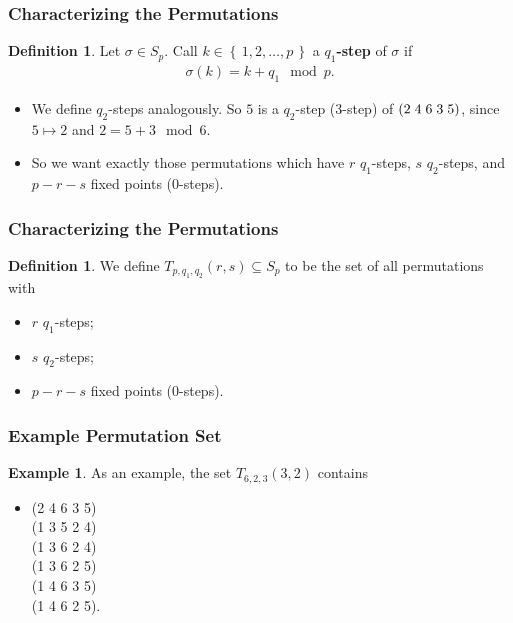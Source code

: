 \documentclass{beamer}
\theoremstyle{plain}
\theoremstyle{definition}
\newtheorem{Def}[theorem]{Definition}
\newtheorem{Ex}[theorem]{Example}
\theoremstyle{remark}
\newcommand{\sub}{\subseteq}			%
\newcommand{\bee}{\begin{equation}\begin{aligned}}
\newcommand{\eee}{\end{aligned}\end{equation}}
\renewcommand{\'}{\hspace{0.5mm}'}		%
\renewcommand{\Set}[1]{\left\{\,#1\,\right\}}	%
\begin{document}

\begin{frame}
\frametitle{Characterizing the Permutations}

\begin{Def}
	Let $\sigma \in S_p$. Call $k \in \Set{1,2,\hdots, p}$
	a $q_1$\textbf{-step} of $\sigma$ if 
	\bee
		\sigma(k) = k + q_1 \mod p. 
	\eee
\end{Def}
\begin{itemize}
	\item We define $q_2$-steps analogously. 
	So $5$ is a $q_2$-step ($3$-step) of 
	$(2\hspace{1mm}4\hspace{1mm}6\hspace{1mm}
	3\hspace{1mm}5)$, since $5 \mapsto 2$ and $2 = 5 + 3 \mod 6$. 
	\item So we want exactly those permutations which
	have $r$ $q_1$-steps, $s$ $q_2$-steps, and 
	$p - r - s$ fixed points ($0$-steps). 
\end{itemize}

\end{frame}


\begin{frame}
\frametitle{Characterizing the Permutations}

\begin{Def}
	We define $T_{p,q_1,q_2}(r,s) \sub S_p$ to be the 
	set of all permutations with 
	\begin{itemize}
		\item $r$ $q_1$-steps;
		\item $s$ $q_2$-steps;
		\item $p - r - s$ fixed points ($0$-steps).
	\end{itemize}
	
\end{Def}

\end{frame}


\begin{frame}
\frametitle{Example Permutation Set}

\begin{Ex}
	As an example, the set $T_{6,2,3}(3,2)$ contains
	\begin{itemize}
		\item[] (2 4 6 3 5)\\
		(1 3 5 2 4)\\
		(1 3 6 2 4)\\
		(1 3 6 2 5)\\
		(1 4 6 3 5)\\
		(1 4 6 2 5).
	\end{itemize}
\end{Ex}
\end{frame}
\end{document}
